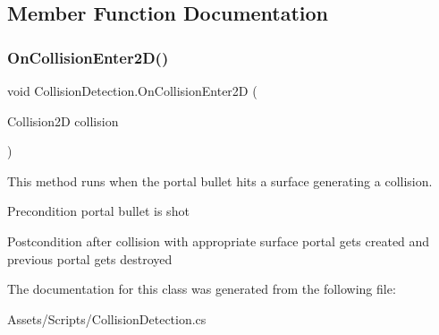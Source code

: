 \subsection{Member Function Documentation}
\mbox{\label{class_collision_detection_ae5c7d4d990b3c888dc8866821a3d0366}} 
\subsubsection{\texorpdfstring{On\+Collision\+Enter2\+D()}{OnCollisionEnter2D()}}
{\footnotesize\ttfamily void Collision\+Detection.\+On\+Collision\+Enter2D (\begin{DoxyParamCaption}\item[{Collision2D}]{collision }\end{DoxyParamCaption})\hspace{0.3cm}{\ttfamily [inline]}}

This method runs when the portal bullet hits a surface generating a collision. \begin{DoxyPrecond}{Precondition}
portal bullet is shot 
\end{DoxyPrecond}
\begin{DoxyPostcond}{Postcondition}
after collision with appropriate surface portal gets created and previous portal gets destroyed 
\end{DoxyPostcond}


The documentation for this class was generated from the following file\+:\begin{DoxyCompactItemize}
\item 
Assets/\+Scripts/Collision\+Detection.\+cs\end{DoxyCompactItemize}
